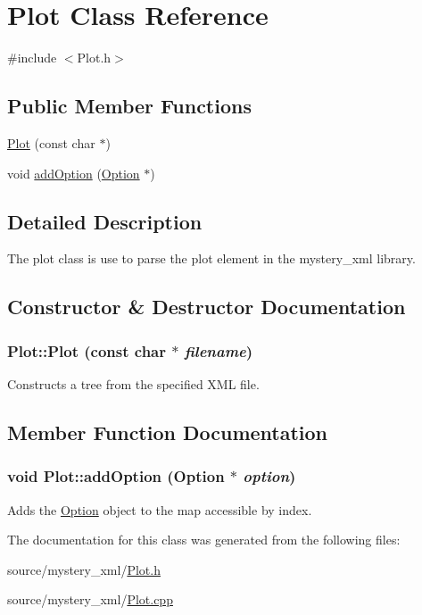 \hypertarget{classPlot}{
\section{Plot Class Reference}
\label{classPlot}
}


{\ttfamily \#include $<$Plot.h$>$}\subsection*{Public Member Functions}
\begin{DoxyCompactItemize}
\item 
\hyperlink{classPlot_a836271d0487e811f66768dadb44e4548}{Plot} (const char $\ast$)
\item 
void \hyperlink{classPlot_abdaa02f5857205d8eda001462be0d9f7}{addOption} (\hyperlink{classOption}{Option} $\ast$)
\end{DoxyCompactItemize}


\subsection{Detailed Description}
The plot class is use to parse the plot element in the mystery\_\-xml library. 

\subsection{Constructor \& Destructor Documentation}
\hypertarget{classPlot_a836271d0487e811f66768dadb44e4548}{
\subsubsection[{Plot}]{\setlength{\rightskip}{0pt plus 5cm}Plot::Plot (const char $\ast$ {\em filename})}}
\label{classPlot_a836271d0487e811f66768dadb44e4548}
Constructs a tree from the specified XML file. 

\subsection{Member Function Documentation}
\hypertarget{classPlot_abdaa02f5857205d8eda001462be0d9f7}{
\subsubsection[{addOption}]{\setlength{\rightskip}{0pt plus 5cm}void Plot::addOption ({\bf Option} $\ast$ {\em option})}}
\label{classPlot_abdaa02f5857205d8eda001462be0d9f7}
Adds the \hyperlink{classOption}{Option} object to the map accessible by index. 

The documentation for this class was generated from the following files:\begin{DoxyCompactItemize}
\item 
source/mystery\_\-xml/\hyperlink{Plot_8h}{Plot.h}\item 
source/mystery\_\-xml/\hyperlink{Plot_8cpp}{Plot.cpp}\end{DoxyCompactItemize}
